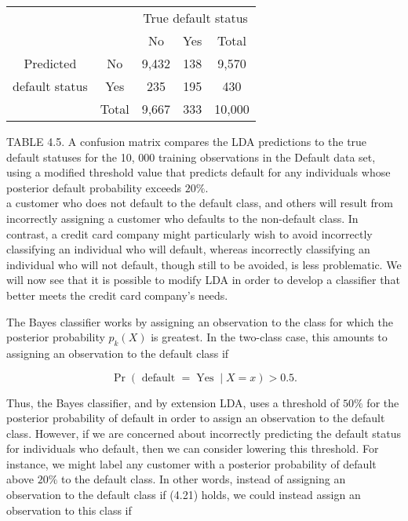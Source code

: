 \documentclass[10pt]{article}
\begin{document}

\begin{center}
\begin{tabular}{cc|cc|c}
\hline
 &  & \multicolumn{3}{|c}{True default status} \\
 &  & No & Yes & Total \\
\hline
Predicted & No & 9,432 & 138 & 9,570 \\
default status & Yes & 235 & 195 & 430 \\
\cline { 2 - 5 }
 & Total & 9,667 & 333 & 10,000 \\
\hline
\end{tabular}
\end{center}

TABLE 4.5. A confusion matrix compares the LDA predictions to the true default statuses for the 10, 000 training observations in the Default data set, using a modified threshold value that predicts default for any individuals whose posterior default probability exceeds $20 \%$.\\
a customer who does not default to the default class, and others will result from incorrectly assigning a customer who defaults to the non-default class. In contrast, a credit card company might particularly wish to avoid incorrectly classifying an individual who will default, whereas incorrectly classifying an individual who will not default, though still to be avoided, is less problematic. We will now see that it is possible to modify LDA in order to develop a classifier that better meets the credit card company's needs.

The Bayes classifier works by assigning an observation to the class for which the posterior probability $p_{k}(X)$ is greatest. In the two-class case, this amounts to assigning an observation to the default class if


\begin{equation*}
\operatorname{Pr}(\text { default }=\operatorname{Yes} \mid X=x)>0.5 . \tag{4.21}
\end{equation*}


Thus, the Bayes classifier, and by extension LDA, uses a threshold of $50 \%$ for the posterior probability of default in order to assign an observation to the default class. However, if we are concerned about incorrectly predicting the default status for individuals who default, then we can consider lowering this threshold. For instance, we might label any customer with a posterior probability of default above $20 \%$ to the default class. In other words, instead of assigning an observation to the default class if (4.21) holds, we could instead assign an observation to this class if
\end{document}
